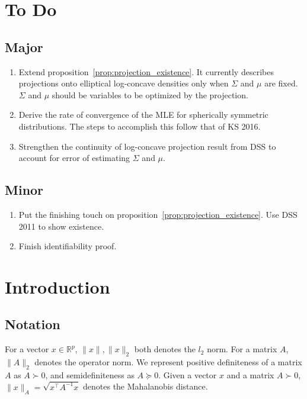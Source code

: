 \documentclass[12pt]{article}
\begin{document}
\section{To Do}

\subsection{Major}
\begin{enumerate}
\item Extend proposition~\ref{prop:projection_existence}. It currently describes projections onto elliptical log-concave densities only when $\Sigma$ and $\mu$ are fixed. $\Sigma$ and $\mu$ should be variables to be optimized by the projection.
\item Derive the rate of convergence of the MLE for spherically symmetric distributions. The steps to accomplish this follow that of KS 2016. 
\item Strengthen the continuity of log-concave projection result from DSS to account for error of estimating $\Sigma$ and $\mu$. 
\end{enumerate}

\subsection{Minor}
\begin{enumerate}
\item Put the finishing touch on proposition~\ref{prop:projection_existence}. Use DSS 2011 to show existence.
\item Finish identifiability proof.
\end{enumerate}

\section{Introduction}

\subsection{Notation}

For a vector $x \in \mathbb{R}^p$, $\| x \|, \|x \|_2$ both denotes the $l_2$ norm. For a matrix $A$, $\| A \|_2$ denotes the operator norm. We represent positive definiteness of a matrix $A$ as $A \succ 0$, and semidefiniteness as $A \succeq 0$. Given a vector $x$ and a matrix $A \succ 0$, $\| x \|_A = \sqrt{ x^\top A^{-1} x }$ denotes the Mahalanobis distance.
\end{document}
